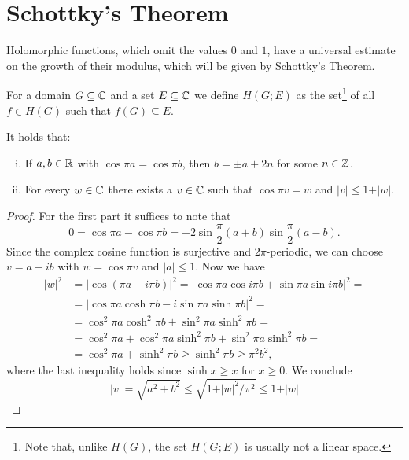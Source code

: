 \section{Schottky's Theorem}
\label{sec:schottkys-theorem}

Holomorphic functions, which omit the values $0$ and $1$, have a universal estimate on the growth of their modulus, which will be given by Schottky's Theorem.

For a domain $G \subseteq \mathbb{C}$ and a set $E \subseteq \mathbb{C}$ we define $H(G; E)$ as the set\footnote{Note that, unlike $H(G)$, the set $H(G; E)$ is usually not a linear space.} of all $f \in H(G)$ such that $f(G) \subseteq E$.

\begin{lemma} \label{lem:schottky-1}
    It holds that:
    \begin{enumerate}[i.]
        \item If $a, b \in \mathbb{R}$ with $\cos \pi a = \cos \pi b$, then $b = \pm a + 2n$ for some $n \in \mathbb{Z}$.
        \item For every $w \in \mathbb{C}$ there exists a $v \in \mathbb{C}$ such that $\cos \pi v = w$ and $\vert v \vert \leq 1 + \vert w \vert$.
    \end{enumerate}
\end{lemma}

\begin{proof}
    For the first part it suffices to note that
    $$ 0 = \cos \pi a - \cos \pi b = \textstyle -2 \sin \frac{\pi}{2} ( a + b ) \sin \frac{\pi}{2} ( a - b ). $$
    Since the complex cosine function is surjective and $2 \pi$-periodic, we can choose $v = a + i b$ with $w = \cos \pi v$ and $\vert a \vert \leq 1$. Now we have
    \begin{align*}
        \vert w \vert^2 &= \vert \cos (\pi a + i \pi b) \vert^2 = \vert \cos \pi a \cos i \pi b + \sin \pi a \sin i \pi b \vert^2 = \\
        &= \vert \cos \pi a \cosh \pi b - i \sin \pi a \sinh \pi b \vert^2 = \\
        &= \cos^2 \pi a \cosh^2 \pi b + \sin^2 \pi a \sinh^2 \pi b = \\
        &= \cos^2 \pi a + \cos^2 \pi a \sinh^2 \pi b + \sin^2 \pi a \sinh^2 \pi b = \\
        &= \cos^2 \pi a + \sinh^2 \pi b \geq \sinh^2 \pi b \geq \pi^2 b^2,
    \end{align*}
    where the last inequality holds since $\sinh x \geq x$ for $x \geq 0$. We conclude
    \begin{equation*}
        \vert v \vert = \sqrt{a^2 + b^2} \leq \sqrt{1 + \vert w \vert^2 / \pi^2} \leq 1 + \vert w \vert
    \end{equation*}
\end{proof}

